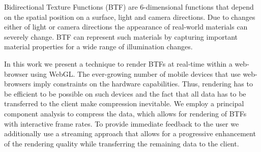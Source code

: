 Bidirectional Texture Functions (BTF) are 6-dimensional functions that depend on the spatial position on a surface, light and camera directions.
 Due to changes either of light or camera directions the appearance of real-world materials can severely change.
 BTF can represent such materials by capturing important material properties for a wide range of illumination changes.

In this work we present a technique to render BTFs at real-time within a web-browser using WebGL. 
The ever-growing number of mobile devices that use web-browsers imply constraints on the hardware capabilities.
Thus, rendering has to be efficient to be possible on such devices and the fact that all data has to be transferred to the client make compression inevitable.  
We employ a principal component analysis to compress the data, which allows for rendering of BTFs with interactive frame rates. 
To provide immediate feedback to the user we additionally use a streaming approach that allows for a progressive enhancement of the rendering quality
while transferring the remaining data to the client. 





